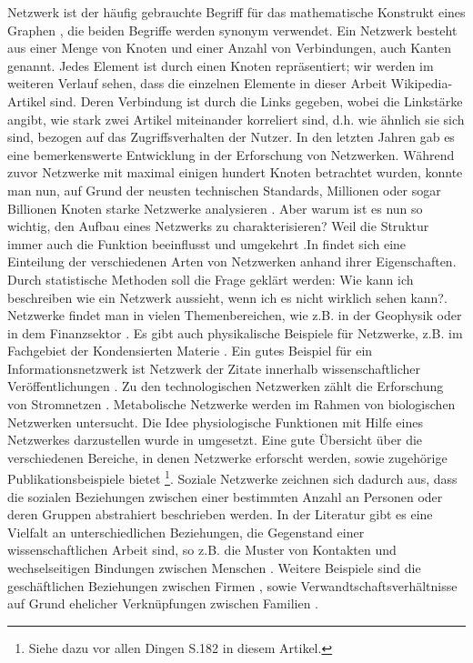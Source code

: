\documentclass[fontsize=11pt, twoside, a4paper]{scrartcl}
\begin{document}
Netzwerk ist der häufig gebrauchte Begriff für das mathematische Konstrukt eines Graphen \cite{ComplexNetworks}, die beiden Begriffe werden synonym verwendet. Ein Netzwerk besteht aus einer Menge von Knoten und einer Anzahl von Verbindungen, auch Kanten genannt. Jedes Element ist durch einen Knoten repräsentiert; wir werden im weiteren Verlauf sehen, dass die einzelnen Elemente in dieser Arbeit Wikipedia-Artikel sind. Deren Verbindung ist durch die Links gegeben, wobei die Linkstärke angibt, wie stark zwei Artikel miteinander korreliert sind, d.h. wie ähnlich sie sich sind, bezogen auf das Zugriffsverhalten der Nutzer. In den letzten Jahren gab es eine bemerkenswerte Entwicklung in der Erforschung von Netzwerken. Während zuvor Netzwerke mit maximal einigen hundert Knoten betrachtet wurden, konnte man nun, auf Grund der neusten technischen Standards, Millionen oder sogar Billionen Knoten starke Netzwerke analysieren \cite{Newman}. Aber warum ist es nun so wichtig, den Aufbau eines Netzwerks zu charakterisieren? Weil die Struktur immer auch die Funktion beeinflusst und umgekehrt \cite{ExploringNetworks}.In \cite{Boccaletti} findet sich eine Einteilung der verschiedenen Arten von Netzwerken anhand ihrer Eigenschaften. Durch statistische Methoden soll die Frage geklärt werden: \glqq Wie kann ich beschreiben wie ein Netzwerk aussieht, wenn ich es nicht wirklich sehen kann?\grqq \cite{Newman}.\\
Netzwerke findet man in vielen Themenbereichen, wie z.B. in der Geophysik \cite{ChaoticDynamics} oder in dem Finanzsektor \cite{EconomicIndex}. Es gibt auch physikalische Beispiele für Netzwerke, z.B. im Fachgebiet der Kondensierten Materie \cite{CondensedMatter}. Ein gutes Beispiel für ein Informationsnetzwerk ist Netzwerk der Zitate innerhalb wissenschaftlicher Veröffentlichungen \cite{Egghe}. Zu den technologischen Netzwerken zählt die Erforschung von Stromnetzen \cite{Watts}. Metabolische Netzwerke \cite{Jeong} werden im Rahmen von biologischen Netzwerken untersucht. Die Idee physiologische Funktionen mit Hilfe eines Netzwerkes darzustellen wurde in \cite{Physiology} umgesetzt. Eine gute Übersicht über die verschiedenen Bereiche, in denen Netzwerke erforscht werden, sowie zugehörige Publikationsbeispiele bietet \cite{Newman}\footnote{Siehe dazu vor allen Dingen S.182 in diesem Artikel.}. Soziale Netzwerke zeichnen sich dadurch aus, dass die sozialen Beziehungen zwischen einer bestimmten Anzahl an Personen oder deren Gruppen abstrahiert beschrieben werden. In der Literatur gibt es eine Vielfalt an unterschiedlichen Beziehungen, die Gegenstand einer wissenschaftlichen Arbeit sind, so z.B. die Muster von Kontakten und wechselseitigen Bindungen zwischen Menschen \cite{Scott,Wasserman}. Weitere Beispiele sind die geschäftlichen Beziehungen zwischen Firmen \cite{Mariolis,Mizruchi}, sowie Verwandtschaftsverhältnisse auf Grund ehelicher Verknüpfungen zwischen Familien \cite{Padgett}.\\[\baselineskip]
\end{document}
